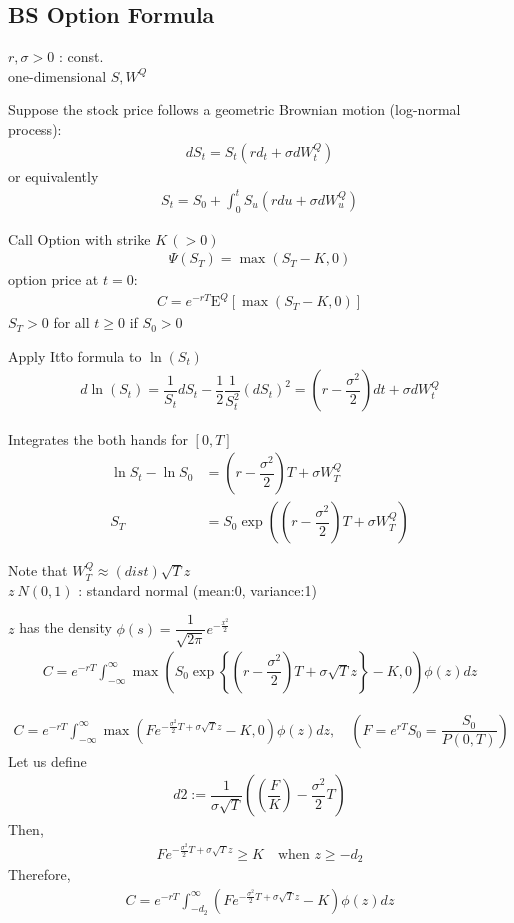 \documentclass[a4paper,11pt]{jsarticle}
\theoremstyle{definition}
\newcommand{\df}[2]{\dfrac{#1}{#2}}
\newcommand{\intinf}{\int_{-\infty}^{\infty}}
\begin{document}
\subsection{BS Option Formula}
$r, \sigma >0$ : const. \\
one-dimensional $S, W^Q$

Suppose the stock price follows a geometric Brownian motion
(log-normal process):
\begin{align}
  dS_t=S_t(rd_t+\sigma dW_t^Q)
\end{align}
or equivalently
\begin{align}
  S_t = S_0 +\int_0^t S_u(rdu+\sigma dW_u^Q)
\end{align}

Call Option with strike $K \,(>0)$
\begin{align}
  \Psi(S_T)=\max(S_T-K,0)
\end{align}
option price at $t=0$:
\begin{align}
  C=e^{-rT}\mathrm{E}^Q[\max(S_T-K,0)]
\end{align}
$S_T>0$ for all $t\geq 0$ if $S_0>0$

Apply It\^{t}o formula to $\ln (S_t)$
\begin{align}
  d\ln(S_t)=\df{1}{S_t}dS_t-\df{1}{2}\df{1}{S_t^2}(dS_t)^2
  =\left(r-\df{\sigma^2}{2} \right)dt+\sigma dW_t^Q
\end{align}

Integrates the both hands for $[0,T]$
\begin{align}
  \ln S_t -\ln S_0
  &=\left(r-\df{\sigma^2}{2} \right)T+\sigma W_T^Q \\
  S_T&=S_0 \exp\left(
  \left(r-\df{\sigma^2}{2} \right)T+\sigma W_T^Q\right)
\end{align}

Note that $W_T^Q \approx(dist) \sqrt{T}z$ \\
$z~N(0,1)$ : standard normal (mean:0, variance:1)

$z$ has the density $\phi(s)=\df{1}{\sqrt{2\pi}}
e^{-\frac{x^2}{2}}$
\begin{align}
  C=e^{-rT}\intinf \max\left(S_0 \exp\left\{
  \left(r-\df{\sigma^2}{2}\right)T+\sigma\sqrt{T}z\right\}
  -K,0\right)\phi(z)dz
\end{align}

\begin{align}
  C=e^{-rT}\intinf \max\left(Fe^{-\frac{\sigma^2}{2}T
  +\sigma\sqrt{T}z}-K,0 \right)\phi(z)dz,
  \quad (F=e^{rT}S_0=\df{S_0}{P(0,T)})
\end{align}
Let us define
\begin{align}
  d2:=\df{1}{\sigma\sqrt{T}}\left(\left(\df{F}{K}\right)
  -\df{\sigma^2}{2}T\right)
\end{align}
Then,
\begin{align}
  Fe^{-\frac{\sigma^2}{2}T+\sigma\sqrt{T}z}\geq K
  \quad \mbox{when } z\geq -d_2
\end{align}
Therefore,
\begin{align}
  C=e^{-rT}\int_{-d_2}^{\infty} \left(
  Fe^{-\frac{\sigma^2}{2}T+\sigma\sqrt{T}z}-K\right)\phi(z)dz
\end{align}
\end{document}
